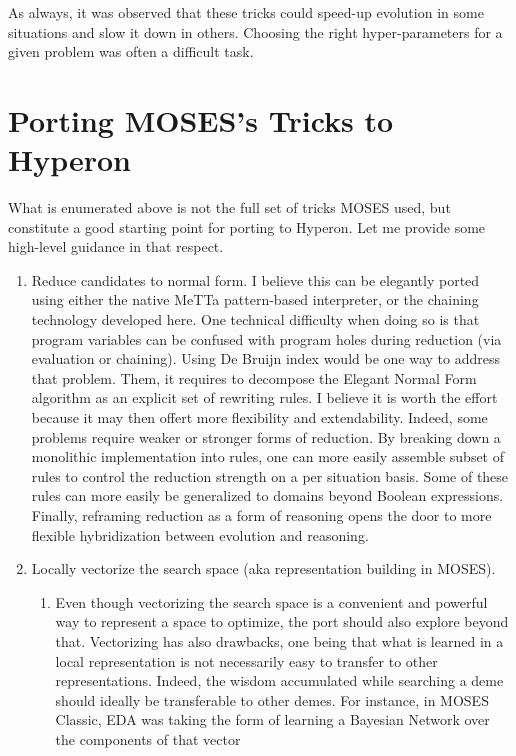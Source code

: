 \documentclass[]{report}
\begin{document}
As always, it was observed that these tricks could speed-up evolution
in some situations and slow it down in others.  Choosing the right
hyper-parameters for a given problem was often a difficult task.

\section{Porting MOSES's Tricks to Hyperon}

What is enumerated above is not the full set of tricks MOSES used, but
constitute a good starting point for porting to Hyperon.  Let me
provide some high-level guidance in that respect.

\begin{enumerate}
\item Reduce candidates to normal form.  I believe this can be
  elegantly ported using either the native MeTTa pattern-based
  interpreter, or the chaining technology developed here.  One
  technical difficulty when doing so is that program variables can be
  confused with program holes during reduction (via evaluation or
  chaining).  Using De Bruijn index would be one way to address that
  problem.  Them, it requires to decompose the Elegant Normal Form
  algorithm as an explicit set of rewriting rules.  I believe it is
  worth the effort because it may then offert more flexibility and
  extendability.  Indeed, some problems require weaker or stronger
  forms of reduction.  By breaking down a monolithic implementation
  into rules, one can more easily assemble subset of rules to control
  the reduction strength on a per situation basis.  Some of these
  rules can more easily be generalized to domains beyond Boolean
  expressions.  Finally, reframing reduction as a form of reasoning
  opens the door to more flexible hybridization between evolution and
  reasoning.
\item Locally vectorize the search space (aka representation building
  in MOSES).
\begin{enumerate}
\item Even though vectorizing the search space is a convenient and
  powerful way to represent a space to optimize, the port should also
  explore beyond that.  Vectorizing has also drawbacks, one being that
  what is learned in a local representation is not necessarily easy to
  transfer to other representations.  Indeed, the wisdom accumulated
  while searching a deme should ideally be transferable to other
  demes.  For instance, in MOSES Classic, EDA was taking the form of
  learning a Bayesian Network over the components of that vector

\end{enumerate}
\end{enumerate}
\end{document}
